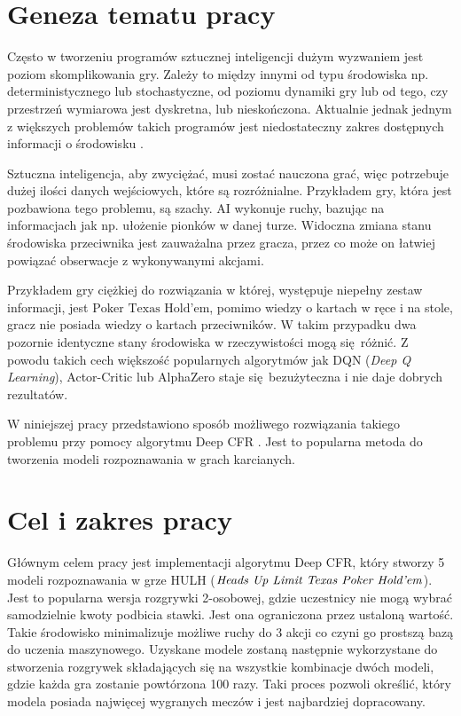 \documentclass[12pt,oneside,a4paper]{report}
\begin{document}
\section{Geneza tematu pracy}

Często w tworzeniu programów sztucznej inteligencji dużym 
wyzwaniem jest poziom skomplikowania gry. 
Zależy to między innymi od typu środowiska np. deterministycznego lub stochastyczne, 
od poziomu dynamiki gry lub od tego, czy przestrzeń wymiarowa jest
dyskretna, lub nieskończona.
Aktualnie jednak jednym z większych problemów takich programów jest niedostateczny
zakres dostępnych informacji o środowisku \cite{iig}.

Sztuczna inteligencja, aby zwyciężać,
musi zostać nauczona grać, więc potrzebuje dużej ilości danych wejściowych, które są 
rozróżnialne. Przykładem gry, która jest pozbawiona tego problemu, są szachy. 
AI wykonuje ruchy, bazując na informacjach jak np. ułożenie pionków
w danej turze. Widoczna zmiana stanu środowiska przeciwnika jest
zauważalna przez gracza, przez co może on łatwiej powiązać
obserwacje z wykonywanymi akcjami. 

Przykładem gry ciężkiej do rozwiązania w której, występuje niepełny zestaw informacji, 
jest $\text{Poker Texas Hold'em}$, pomimo wiedzy o kartach w ręce i na stole, gracz nie posiada
wiedzy o 
kartach przeciwników. W takim przypadku dwa pozornie identyczne stany środowiska w
rzeczywistości mogą się różnić. Z powodu takich cech większość popularnych algorytmów jak 
DQN (\emph{Deep Q Learning}), Actor-Critic lub AlphaZero staje się bezużyteczna i nie daje dobrych rezultatów.

W niniejszej pracy przedstawiono sposób możliwego rozwiązania takiego problemu przy pomocy 
algorytmu Deep CFR \cite{DCFR}. Jest to popularna metoda do tworzenia modeli
rozpoznawania w grach karcianych.

\section{Cel i zakres pracy}

Głównym celem pracy jest implementacji algorytmu Deep CFR, który stworzy 5 modeli
rozpoznawania w grze HULH ($\text{\emph{Heads Up Limit Texas 
Poker Hold'em}}$). Jest to popularna wersja rozgrywki 2-osobowej, gdzie uczestnicy nie mogą wybrać
samodzielnie kwoty podbicia stawki. Jest ona ograniczona przez ustaloną wartość. Takie środowisko
minimalizuje możliwe ruchy do 3 akcji co czyni go prostszą bazą do uczenia maszynowego. Uzyskane modele zostaną następnie 
wykorzystane do stworzenia
rozgrywek składających się na wszystkie kombinacje dwóch modeli, gdzie każda gra zostanie 
powtórzona 100 razy. Taki proces pozwoli określić, który modela posiada najwięcej wygranych meczów i
jest najbardziej dopracowany. 
\end{document}
